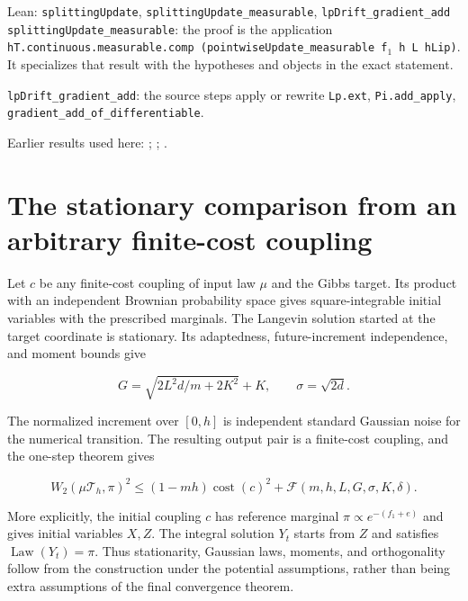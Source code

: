 \documentclass[11pt,a4paper]{article}
\begin{document}
\begin{leanbox}{Lean: \texttt{splittingUpdate}, \texttt{splittingUpdate\_\allowbreak{}measurable}, \texttt{lpDrift\_\allowbreak{}gradient\_\allowbreak{}add}}
\texttt{splitting\allowbreak{}Update\_\allowbreak{}measurable}: the proof is the application \texttt{h\allowbreak{}T.\allowbreak{}continuous.\allowbreak{}measurable.\allowbreak{}comp (pointwise\allowbreak{}Update\_\allowbreak{}measurable f\ensuremath{{}_{1}} h L h\allowbreak{}Lip)}. It specializes that result with the hypotheses and objects in the exact statement.



\texttt{lp\allowbreak{}Drift\_\allowbreak{}gradient\_\allowbreak{}add}: the source steps apply or rewrite \texttt{Lp.\allowbreak{}ext}, \texttt{Pi.\allowbreak{}add\_\allowbreak{}apply}, \texttt{gradient\_\allowbreak{}add\_\allowbreak{}of\_\allowbreak{}differentiable}.
\end{leanbox}


Earlier results used here: \cite[Section~3.13.2]{LangevinLean2026ULASC}; \cite[Section~3.13.3]{LangevinLean2026ULASC}; \cite[Section~3.23.2]{LangevinLean2026ULASC}.

\section{\texorpdfstring{The stationary comparison from an arbitrary finite-cost coupling}{The stationary comparison from an arbitrary finite-cost coupling}}


Let \(c\) be any finite-cost coupling of input law \(\mu\) and the Gibbs target. Its product with an independent Brownian probability space gives square-integrable initial variables with the prescribed marginals. The Langevin solution started at the target coordinate is stationary. Its adaptedness, future-increment independence, and moment bounds give

\[G=\sqrt{2L^2d/m+2K^2}+K,\qquad\sigma=\sqrt{2d}.\]

The normalized increment over \([0,h]\) is independent standard Gaussian noise for the numerical transition. The resulting output pair is a finite-cost coupling, and the one-step theorem gives

\[W_2(\mu\mathcal T_h,\pi)^2\le(1-mh)\operatorname{cost}(c)^2+\mathcal F(m,h,L,G,\sigma,K,\delta).\]

More explicitly, the initial coupling \(c\) has reference marginal \(\pi\propto e^{-(f_1+e)}\) and gives initial variables \(X,Z\). The integral solution \(Y_t\) starts from \(Z\) and satisfies \(\operatorname{Law}(Y_t)=\pi\). Thus stationarity, Gaussian laws, moments, and orthogonality follow from the construction under the potential assumptions, rather than being extra assumptions of the final convergence theorem.
\end{document}
